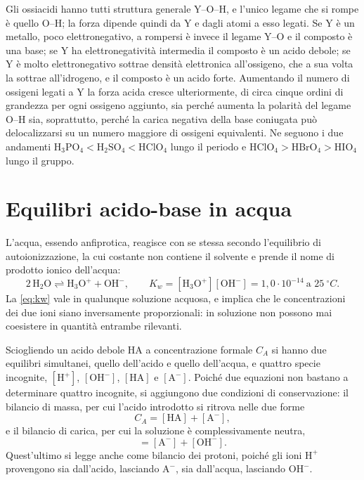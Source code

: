 Gli ossiacidi hanno tutti struttura generale $\mathrm{Y}$--$\mathrm{O}$--$\mathrm{H}$, e l'unico legame che si rompe è quello $\mathrm{O}$--$\mathrm{H}$; la forza dipende quindi da $\mathrm{Y}$ e dagli atomi a esso legati.
Se $\mathrm{Y}$ è un metallo, poco elettronegativo, a rompersi è invece il legame $\mathrm{Y}$--$\mathrm{O}$ e il composto è una base; se $\mathrm{Y}$ ha elettronegatività intermedia il composto è un acido debole; se $\mathrm{Y}$ è molto elettronegativo sottrae densità elettronica all'ossigeno, che a sua volta la sottrae all'idrogeno, e il composto è un acido forte.
Aumentando il numero di ossigeni legati a $\mathrm{Y}$ la forza acida cresce ulteriormente, di circa cinque ordini di grandezza per ogni ossigeno aggiunto, sia perché aumenta la polarità del legame $\mathrm{O}$--$\mathrm{H}$ sia, soprattutto, perché la carica negativa della base coniugata può delocalizzarsi su un numero maggiore di ossigeni equivalenti.
Ne seguono i due andamenti $\mathrm{H_3PO_4} < \mathrm{H_2SO_4} < \mathrm{HClO_4}$ lungo il periodo e $\mathrm{HClO_4} > \mathrm{HBrO_4} > \mathrm{HIO_4}$ lungo il gruppo.
 

\section{Equilibri acido-base in acqua}
 
L'acqua, essendo anfiprotica, reagisce con se stessa secondo l'equilibrio di autoionizzazione, la cui costante non contiene il solvente e prende il nome di prodotto ionico dell'acqua:
\begin{equation}
    2\,\mathrm{H_2O} \rightleftharpoons \mathrm{H_3O^+} + \mathrm{OH^-} ,
    \qquad
    K_w = [\mathrm{H_3O^+}][\mathrm{OH^-}] = 1{,}0\cdot10^{-14} \ \text{a } 25 \ ^\circ C .
    \label{eq:kw}
\end{equation}
La \eqref{eq:kw} vale in qualunque soluzione acquosa, e implica che le concentrazioni dei due ioni siano inversamente proporzionali: in soluzione non possono mai coesistere in quantità entrambe rilevanti.
 
Sciogliendo un acido debole $\mathrm{HA}$ a concentrazione formale $C_A$ si hanno due equilibri simultanei, quello dell'acido e quello dell'acqua, e quattro specie incognite, $[\mathrm{H^+}]$, $[\mathrm{OH^-}]$, $[\mathrm{HA}]$ e $[\mathrm{A^-}]$.
Poiché due equazioni non bastano a determinare quattro incognite, si aggiungono due condizioni di conservazione: il bilancio di massa, per cui l'acido introdotto si ritrova nelle due forme
\begin{equation}
    C_A = [\mathrm{HA}] + [\mathrm{A^-}] ,
    \label{eq:bilancio_massa}
\end{equation}
e il bilancio di carica, per cui la soluzione è complessivamente neutra,
\begin{equation}
    [\mathrm{H^+}] = [\mathrm{A^-}] + [\mathrm{OH^-}] .
    \label{eq:bilancio_carica}
\end{equation}
Quest'ultimo si legge anche come bilancio dei protoni, poiché gli ioni $\mathrm{H^+}$ provengono sia dall'acido, lasciando $\mathrm{A^-}$, sia dall'acqua, lasciando $\mathrm{OH^-}$.
 
